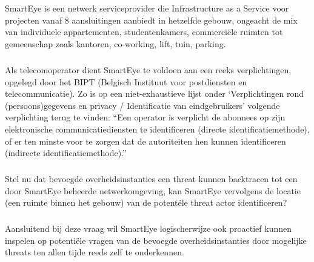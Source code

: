 
\chapter{}%
\label{ch:inleiding}

\paragraph{}
SmartEye is een netwerk serviceprovider die Infrastructure as a Service voor projecten vanaf 8 aansluitingen aanbiedt in hetzelfde gebouw, ongeacht de mix van individuele appartementen, studentenkamers, commerciële ruimten tot gemeenschap zoals kantoren, co-working, lift, tuin, parking.~\autocite{Smarteye2021}

\paragraph{}
Als telecomoperator dient SmartEye te voldoen aan een reeks verplichtingen, opgelegd door het BIPT (Belgisch Instituut voor postdiensten en telecommunicatie). Zo is op een niet-exhaustieve lijst onder ‘Verplichtingen rond (persoons)gegevens en privacy / Identificatie van eindgebruikers’ volgende verplichting terug te vinden: “Een operator is verplicht de abonnees op zijn elektronische communicatiediensten te identificeren (directe identificatiemethode), of er ten minste voor te zorgen dat de autoriteiten hen kunnen identificeren (indirecte identificatiemethode).”~\autocite{BIPT2023}

\paragraph{}
Stel nu dat bevoegde overheidsinstanties een threat kunnen backtracen tot een door SmartEye beheerde netwerkomgeving, kan SmartEye vervolgens de locatie (een ruimte binnen het gebouw) van de potentële threat actor identificeren?

\paragraph{}
Aansluitend bij deze vraag wil SmartEye logischerwijze ook proactief kunnen inspelen op potentiële vragen van de bevoegde overheidsinstanties door mogelijke threats ten allen tijde reeds zelf te onderkennen.

